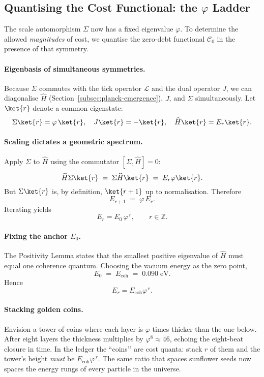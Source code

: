 \documentclass[11pt]{article}
\begin{document}
\subsection{Quantising the Cost Functional: the \texorpdfstring{$\varphi$}{$\varphi$} Ladder}
\label{subsec:quantise-cascade}

The scale automorphism \(\Sigma\) now has a fixed eigenvalue
\(\varphi\).  To determine the allowed \emph{magnitudes} of cost, we
quantise the zero‐debt functional \(\mathcal{C}_{0}\) in the presence of
that symmetry.

\paragraph{Eigenbasis of simultaneous symmetries.}
Because \(\Sigma\) commutes with the tick operator \(\mathcal{L}\) and
the dual operator \(J\), we can diagonalise \(\widehat{H}\)
(Section~\ref{subsec:planck-emergence}), \(J\), and \(\Sigma\)
simultaneously.  Let \(\ket{r}\) denote a common eigenstate:
\[
\Sigma\ket{r} = \varphi\,\ket{r},
\quad
J\ket{r} = -\ket{r},
\quad
\widehat{H}\ket{r} = E_{r}\ket{r}.
\]

\paragraph{Scaling dictates a geometric spectrum.}
Apply \(\Sigma\) to \(\widehat{H}\) using the commutator
\([\Sigma,\widehat{H}]=0\):
\[
\widehat{H}\Sigma\ket{r}
\;=\;
\Sigma\widehat{H}\ket{r}
\;=\;
E_{r}\varphi\ket{r}.
\]
But \(\Sigma\ket{r}\) is, by definition, \(\ket{r+1}\) up to normalisation.
Therefore
\[
E_{r+1}
\;=\;
\varphi\,E_{r}.
\]
Iterating yields
\[
\boxed{\;
E_{r} = E_{0}\,\varphi^{\,r},
\qquad r\in\mathbb{Z}.
\;}
\]

\paragraph{Fixing the anchor \(E_{0}\).}
The Positivity Lemma states that the smallest positive eigenvalue of
\(\widehat{H}\) must equal one coherence quantum.  Choosing the vacuum
energy as the zero point,
\[
E_{0} \;=\; E_{\text{coh}}
           \;=\;0.090\;\text{eV}.
\]
Hence
\[
\boxed{\;
E_{r} = E_{\text{coh}}\varphi^{\,r}.
\;}
\]

\paragraph{Stacking golden coins.}
Envision a tower of coins where each layer is \(\varphi\) times thicker
than the one below.  After eight layers the thickness multiplies by
\(\varphi^{8}\approx 46\), echoing the eight‐beat closure in time.  In
the ledger the “coins’’ are cost quanta: stack \(r\) of them and the
tower’s height \emph{must} be \(E_{\text{coh}}\varphi^{\,r}\).  The same
ratio that spaces sunflower seeds now spaces the energy rungs of every
particle in the universe.
\end{document}
